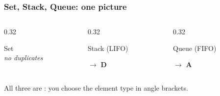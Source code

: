 \documentclass[aspectratio=169,10pt,compress]{beamer}
\begin{document}




\begin{frame}[t,fragile] \frametitle{Set, Stack, Queue: one picture}
  \begin{columns}[T]
    \begin{column}{0.32\textwidth}
      \begin{block}{Set}
        \centering\small
        \\[0.3em]
        \emph{no duplicates}
      \end{block}
      \small {}
    \end{column}
    \begin{column}{0.32\textwidth}
      \begin{block}{Stack (LIFO)}
        \begin{center}
        \end{center}
        \small {} $\to$ \textbf{D}
      \end{block}
      \small {}
    \end{column}
    \begin{column}{0.32\textwidth}
      \begin{block}{Queue (FIFO)}
        \begin{center}
        \end{center}
        \small {} $\to$ \textbf{A}
      \end{block}
      \small {}
    \end{column}
  \end{columns}
  \vspace{0.5em}
  \small All three are : you choose the element type in angle brackets.
\end{frame}
\end{document}
